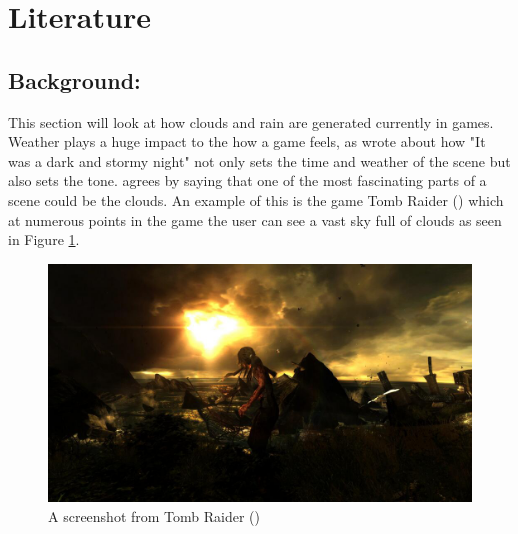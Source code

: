 \clearpage
\section{Literature}
\subsection{Background:}
This section will look at how clouds and rain are generated currently in games.
Weather plays a huge impact to the how a game feels, as \citet{Barton08} wrote about how "It was a dark and stormy night" not only sets the time and weather of the scene but also sets the tone.
\citet{NWang04} agrees by saying that one of the most fascinating parts of a scene could be the clouds.
An example of this is the game Tomb Raider (\citeyear{TombRaider13}) which at numerous points in the game the user can see a vast sky full of clouds as seen in Figure \ref{fig:tomb_raider}. 

\begin{figure}[ht!]
	\centering
	\includegraphics[width=\textwidth]{images/tomb_raider.PNG}
	\caption{A screenshot from Tomb Raider (\citeyear{TombRaider13})}
	\label{fig:tomb_raider}
\end{figure}




